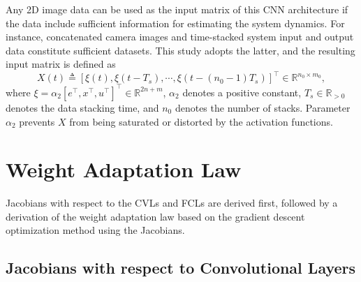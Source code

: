 \documentclass[letterpaper, 10 pt, conference]{ieeeconf}  %
\begin{document}
Any 2D image data can be used as the input matrix of this CNN architecture if the data include sufficient information for estimating the system dynamics. For instance, concatenated camera images and time-stacked system input and output data constitute sufficient datasets. This study adopts the latter, and the resulting input matrix is defined as
\begin{equation}
    X(t)\triangleq[\xi(t), \xi(t-T_s), \cdots, \xi(t-({n_0}-1) T_s)]^\top\in\mathbb{R}^{n_0\times m_0},
\end{equation}
where $\xi=\alpha_2[e^\top  ,x^\top  ,u^\top  ]^\top  \in\mathbb{R}^{2n+m}$, $\alpha_2$ denotes a positive constant, $T_s\in\mathbb{R}_{>0}$ denotes the data stacking time, and $n_0$ denotes the number of stacks.
Parameter $\alpha_2$ prevents $X$ from being saturated or distorted by the activation functions.

\section{Weight Adaptation Law}

Jacobians with respect to the CVLs and FCLs are derived first, followed by a derivation of the weight adaptation law based on the gradient descent optimization method using the Jacobians.


\subsection{Jacobians with respect to Convolutional Layers}\label{subsec: Jacobian CNN}
\end{document}
